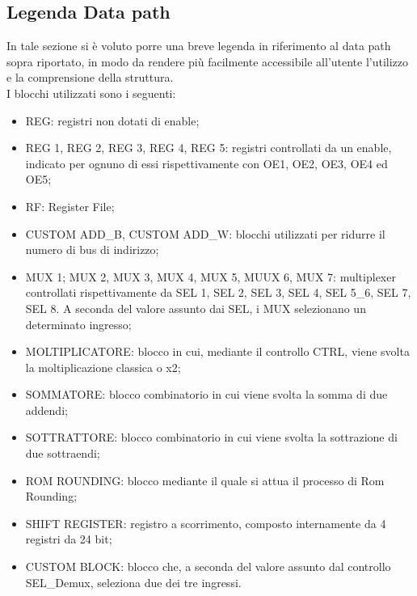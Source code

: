 \documentclass[a4paper, titlepage]{article}
\begin{document}
\subsection{Legenda Data path} %
In tale sezione si è voluto porre una breve legenda in riferimento al data path sopra riportato, in modo da rendere più facilmente accessibile all'utente l'utilizzo e la comprensione della struttura.\\I blocchi utilizzati sono i seguenti:
\begin{itemize}
    \item REG: registri non dotati di enable;
    \item REG 1, REG 2, REG 3, REG 4, REG 5: registri controllati da un enable, indicato per ognuno di essi rispettivamente con OE1, OE2, OE3, OE4 ed OE5;
    \item RF: Register File;
    \item CUSTOM ADD\_B, CUSTOM ADD\_W: blocchi utilizzati per ridurre il numero di bus di indirizzo;
    \item MUX 1; MUX 2, MUX 3, MUX 4, MUX 5, MUUX 6, MUX 7: multiplexer controllati rispettivamente da SEL 1, SEL 2, SEL 3, SEL 4, SEL 5\_6, SEL 7, SEL 8. A seconda del valore assunto dai SEL, i MUX selezionano un determinato ingresso;
    \item MOLTIPLICATORE: blocco in cui, mediante il controllo CTRL, viene svolta la moltiplicazione classica o x2;
    \item SOMMATORE: blocco combinatorio in cui viene svolta la somma di due addendi;
    \item SOTTRATTORE: blocco combinatorio in cui viene svolta la sottrazione di due sottraendi;
    \item ROM ROUNDING: blocco mediante il quale si attua il processo di Rom Rounding;
    \item SHIFT REGISTER: registro a scorrimento, composto internamente da 4 registri da 24 bit;
    \item CUSTOM BLOCK: blocco che, a seconda del valore assunto dal controllo SEL\_Demux, seleziona due dei tre ingressi.
\end{itemize}
\end{document}
